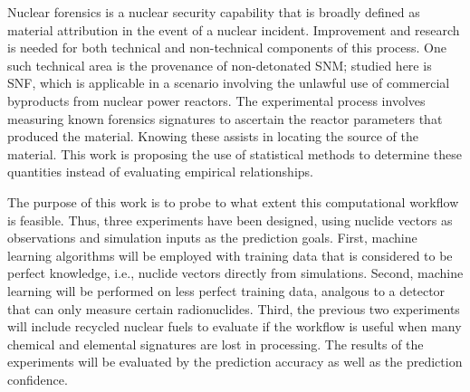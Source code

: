 Nuclear forensics is a nuclear security capability that is broadly defined as
material attribution in the event of a nuclear incident.  Improvement and
research is needed for both technical and non-technical components of this
process.  One such technical area is the provenance of non-detonated \gls{SNM};
studied here is \gls{SNF}, which is applicable in a scenario involving the
unlawful use of commercial byproducts from nuclear power reactors.  The
experimental process involves measuring known forensics signatures to ascertain
the reactor parameters that produced the material. Knowing these assists in
locating the source of the material. This work is proposing the use of
statistical methods to determine these quantities instead of evaluating
empirical relationships. 

The purpose of this work is to probe to what extent this computational workflow
is feasible. Thus, three experiments have been designed, using nuclide vectors
as observations and simulation inputs as the prediction goals.  First, machine
learning algorithms will be employed with training data that is considered to
be perfect knowledge, i.e., nuclide vectors directly from simulations.  Second,
machine learning will be performed on less perfect training data, analgous to a
detector that can only measure certain radionuclides. Third, the previous two
experiments will include recycled nuclear fuels to evaluate if the workflow is
useful when many chemical and elemental signatures are lost in processing. The
results of the experiments will be evaluated by the prediction accuracy as well
as the prediction confidence.

